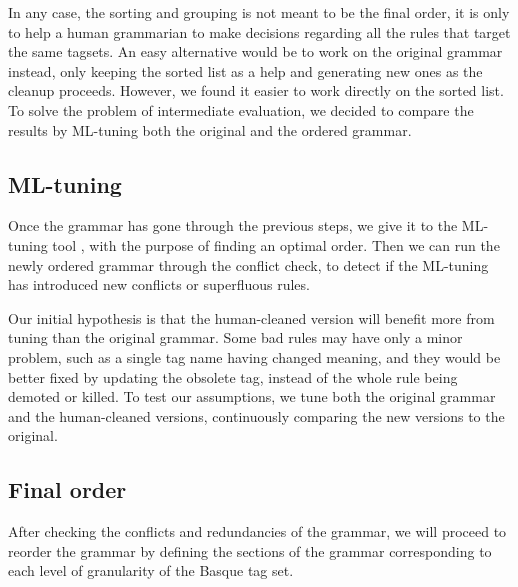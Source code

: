 \documentclass[11pt]{article}
\begin{document}
In any case, the sorting and grouping is not meant to be the final order, it is only 
to help a human grammarian to make decisions regarding all the rules that 
target the same tagsets.
An easy alternative would be to work on the original grammar instead, only
keeping the sorted list as a help and generating new ones as the
cleanup proceeds. However, we found it easier to work directly on the
sorted list. To solve the problem of intermediate evaluation, we
decided to compare the results by ML-tuning both the original and the
ordered grammar.

\subsection{ML-tuning}
Once the grammar has gone through the previous steps, we give it to the 
ML-tuning tool \cite{bick2013tuning}, with the purpose of finding an 
optimal order. Then we can run the newly ordered grammar through the
conflict check, to detect if the ML-tuning has introduced new
conflicts or superfluous rules.

Our initial hypothesis is that the human-cleaned version will benefit more 
from tuning than the original grammar. Some bad rules may have only a minor 
problem, such as a single tag name having changed meaning, and they would be 
better fixed by updating the obsolete tag, instead of the whole rule being 
demoted or killed. To test our assumptions, we tune both the original
grammar and the human-cleaned versions, continuously comparing the new
versions to the original.



\subsection{Final order}

After checking the conflicts and redundancies of the grammar, 
we will proceed to reorder the grammar by defining the sections
of the grammar corresponding to each level of granularity of the Basque tag set.
\end{document}
